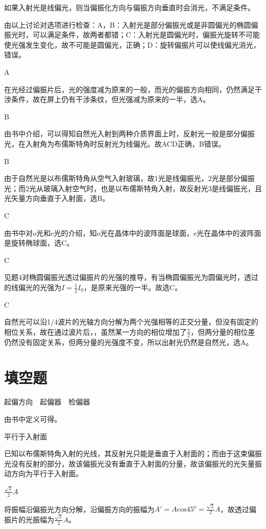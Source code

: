 如果入射光是线偏光，则当偏振化方向与偏振方向垂直时会消光，不满足条件。

由以上讨论对选项进行检查：A，B：入射光是部分偏振光或是非圆偏光的椭圆偏振光时，可以满足条件，故两者都错；C：入射光是圆偏光时，偏振光旋转不可能使光强发生变化，故不可能是圆偏光，正确；D：旋转偏振片可以使线偏光消光，错误。

\exercise A

\solve 在光经过偏振片后，光的强度减为原来的一般，而光的偏振方向相同，仍然满足干涉条件，故在屏上仍有干涉条纹，但光强减为原来的一半，选A。

\exercise B

\solve 由书中介绍，可以得知自然光入射到两种介质界面上时，反射光一般是部分偏振光，在入射角为布儒斯特角时反射光为线偏光。故ACD正确，B错误。

\exercise B

\solve 由于自然光是以布儒斯特角从空气入射玻璃，故1光是线偏振光，2光是部分偏振光；而2光从玻璃入射空气时，也是以布儒斯特角入射，故反射光3是线偏振光，且光矢量方向垂直于入射面，选B。

\exercise C

\solve 由书中对o光和e光的介绍，知o光在晶体中的波阵面是球面，e光在晶体中的波阵面是旋转椭球面，选C。

\exercise C

\solve 见题4对椭圆偏振光透过偏振片的光强的推导，有当椭圆偏振光为圆偏光时，透过的线偏光的光强为$I=\frac{1}{2}I_0$，是原来光强的一半。故选C。

\exercise C

\solve 自然光可以沿1/4波片的光轴方向分解为两个光强相等的正交分量，但没有固定的相位关系，故在通过波片后，，虽然某一方向的相位增加了$\frac{\pi}{2}$，但两分量的相位差仍然没有固定关系，但两分量的光强度不变，所以出射光仍然是自然光，选A。

\section{填空题}

\exercise 起偏方向$\quad$起偏器$\quad$检偏器

\solve 由书中定义可得。

\exercise 平行于入射面

\solve 已知以布儒斯特角入射的光线，其反射光只能是垂直于入射面的；而由于这束偏振光没有反射的部分，故该偏振光没有垂直于入射面的分量，故该偏振光的光矢量振动方向为平行于入射面。

\exercise $\frac{\sqrt{2}}{2}A$

\solve 将振幅沿偏振光方向分解，沿偏振方向的振幅为$A'=A\mathrm{cos}45^{\mathrm{o}}=\frac{\sqrt{2}}{2}A$，故透过偏振片的光振幅为$\frac{\sqrt{2}}{2}A$。

